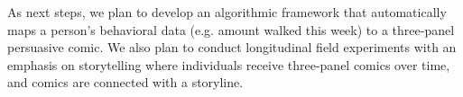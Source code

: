 



As next steps, we plan to develop an algorithmic framework that automatically maps a person's behavioral data (e.g. amount walked this week) to a three-panel persuasive comic. We also plan to conduct longitudinal field experiments with an emphasis on storytelling where individuals receive three-panel comics over time, and comics are connected with a storyline.
